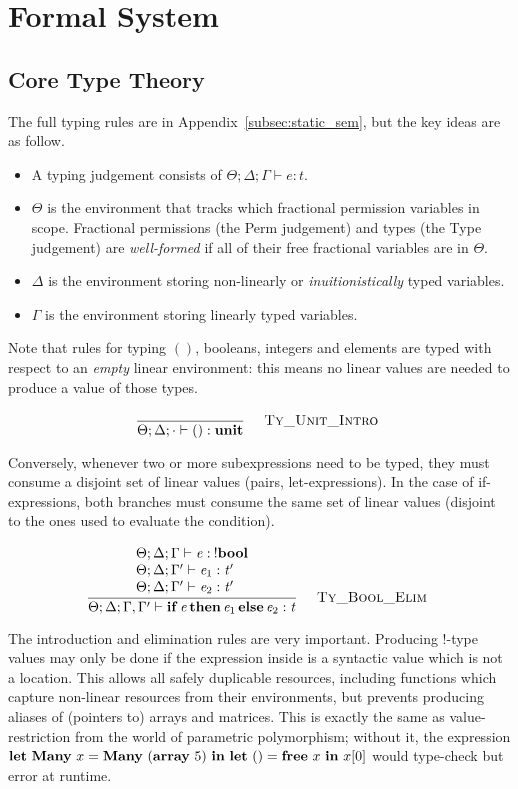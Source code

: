 \section{Formal System}\label{sec:formal_system}

\subsection{Core Type Theory}\label{subsec:core_tt}

The full typing rules are in Appendix~\ref{subsec:static_sem}, but the key
ideas are as follow.

\begin{itemize}

    \item A typing judgement consists of $ \Theta; \Delta; \Gamma \vdash e : t$.

    \item $\Theta$ is the environment that tracks which fractional permission variables
        in scope. Fractional permissions (the \textsf{Perm} judgement) and types (the
        \textsf{Type} judgement) are \emph{well-formed} if all of their free fractional
        variables are in $\Theta$.

    \item $\Delta$ is the environment storing non-linearly or \emph{inuitionistically}
        typed variables.

    \item $\Gamma$ is the environment storing linearly typed variables.

\end{itemize}

Note that rules for typing $()$, booleans, integers and elements are typed
with respect to an \emph{empty} linear environment: this means no linear
values are needed to produce a value of those types.

\vspace{-\baselineskip}
\[
    {\displaystyle\frac{\begin{array}{l} \end{array}}{ \Theta ; \Delta ; \cdot \vdash ( ) : \mathbf{unit}}\quad\textsc{ {\textsc{Ty\_Unit\_Intro}}{} }}
\]

Conversely, whenever two or more subexpressions need to be typed, they must
consume a disjoint set of linear values (pairs, let-expressions).  In the case
of if-expressions, both branches must consume the same set of linear values
(disjoint to the ones used to evaluate the condition).

\vspace{-\baselineskip}
\[
    {\displaystyle\frac{\begin{array}{l} \Theta ; \Delta ; \Gamma \vdash \mathit{e} : \: ! \mathbf{bool} \\ \Theta ; \Delta ; \Gamma' \vdash \mathit{e_{{\mathrm{1}}}} : \mathit{t'} \\ \Theta ; \Delta ; \Gamma' \vdash \mathit{e_{{\mathrm{2}}}} : \mathit{t'} \\ \end{array}}{ \Theta ; \Delta ; \Gamma , \Gamma' \vdash \mathbf{if} \, \mathit{e} \, \mathbf{then} \, \mathit{e_{{\mathrm{1}}}} \, \mathbf{else} \, \mathit{e_{{\mathrm{2}}}} : \mathit{t}}\quad\textsc{ {\textsc{Ty\_Bool\_Elim}}{} }}
\]

The  introduction and elimination rules are very important.
Producing !-type values may only be done if the expression inside is a
syntactic value which is not a location. This allows all safely duplicable
resources, including functions which capture non-linear resources from their
environments, but prevents producing aliases of (pointers to) arrays and
matrices. This is exactly the same as value-restriction from the world of
parametric polymorphism; without it, the expression $\mathbf{let}\ \mathbf{Many}\ x = \mathbf{Many}\
(\mathbf{array}\ 5)\ \mathbf{in}\ \mathbf{let}\ () = \mathbf{free}\ x\ \mathbf{in}\ x[0]$ would
type-check but error at runtime.

